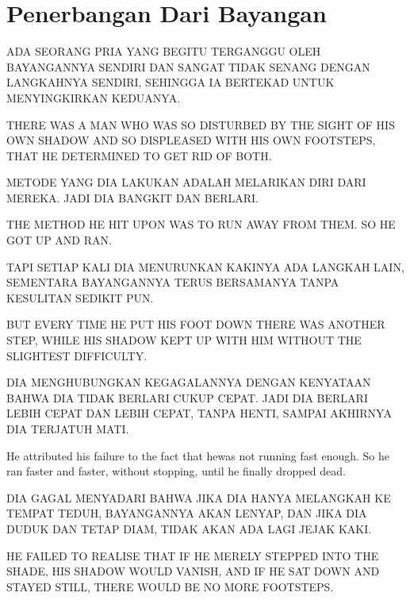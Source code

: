 \chapter{Penerbangan Dari Bayangan}

\bahasa
ADA SEORANG PRIA YANG BEGITU TERGANGGU OLEH BAYANGANNYA SENDIRI DAN SANGAT TIDAK SENANG DENGAN LANGKAHNYA SENDIRI, SEHINGGA IA BERTEKAD UNTUK MENYINGKIRKAN KEDUANYA.

\english
THERE WAS A MAN WHO WAS SO DISTURBED BY THE SIGHT OF HIS OWN SHADOW AND SO DISPLEASED WITH HIS OWN FOOTSTEPS, THAT HE DETERMINED TO GET RID OF BOTH.

\bahasa
METODE YANG DIA LAKUKAN ADALAH MELARIKAN DIRI DARI MEREKA. JADI DIA BANGKIT DAN BERLARI.

\english
THE METHOD HE HIT UPON WAS TO RUN AWAY FROM THEM. SO HE GOT UP AND RAN.

\bahasa
TAPI SETIAP KALI DIA MENURUNKAN KAKINYA ADA LANGKAH LAIN, SEMENTARA BAYANGANNYA TERUS BERSAMANYA TANPA KESULITAN SEDIKIT PUN.

\english
BUT EVERY TIME HE PUT HIS FOOT DOWN THERE WAS ANOTHER STEP, WHILE HIS SHADOW KEPT UP WITH HIM WITHOUT THE SLIGHTEST DIFFICULTY.

\bahasa
DIA MENGHUBUNGKAN KEGAGALANNYA DENGAN KENYATAAN BAHWA DIA TIDAK BERLARI CUKUP CEPAT. JADI DIA BERLARI LEBIH CEPAT DAN LEBIH CEPAT, TANPA HENTI, SAMPAI AKHIRNYA DIA TERJATUH MATI.

\english
He attributed his failure to the fact that hewas not running fast enough. So he ran faster and faster, without stopping, until he finally dropped dead.

\bahasa
DIA GAGAL MENYADARI BAHWA JIKA DIA HANYA MELANGKAH KE TEMPAT TEDUH, BAYANGANNYA AKAN LENYAP, DAN JIKA DIA DUDUK DAN TETAP DIAM, TIDAK AKAN ADA LAGI JEJAK KAKI.

\english
HE FAILED TO REALISE THAT IF HE MERELY STEPPED INTO THE SHADE, HIS SHADOW WOULD VANISH, AND IF HE SAT DOWN AND STAYED STILL, THERE WOULD BE NO MORE FOOTSTEPS.
